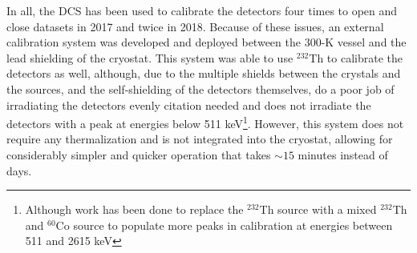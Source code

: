 In all, the DCS has been used to calibrate the detectors four times to open and close datasets in 2017 and twice in 2018.
Because of these issues, an external calibration system was developed and deployed between the 300-K vessel and the lead shielding of the cryostat.
This system was able to use $^{232}$Th to calibrate the detectors as well, although, due to the multiple shields between the crystals and the sources, and the self-shielding of the detectors themselves, do a poor job of irradiating the detectors evenly\color{red} citation needed \color{black} and does not irradiate the detectors with a peak at energies below 511 keV\footnote{Although work has been done to replace the $^{232}$Th source with a mixed $^{232}$Th and $^{60}$Co source to populate more peaks in calibration at energies between 511 and 2615 keV}.
However, this system does not require any thermalization and is not integrated into the cryostat, allowing for considerably simpler and quicker operation that takes $\sim15$ minutes instead of days.

